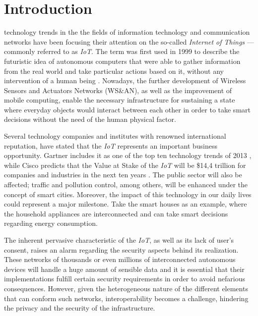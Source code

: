 \documentclass[journal]{IEEEtran}
\begin{document}
\section{Introduction}
   technology trends in the the fields of information technology and communication networks have been focusing their attention on the so-called \emph{Internet of Things} ---commonly referred to as \emph{IoT}. The term was first used in 1999 to describe the futuristic idea of autonomous computers that were able to gather information from the real world and take particular actions based on it, without any intervention of a human being \cite{Ashton2009}. Nowadays, the further development of Wireless Sensors and Actuators Networks (WS\&AN), as well as the improvement of mobile computing, enable the necessary infrastructure for sustaining a state where everyday objects would interact between each other in order to take smart decisions without the need of the human physical factor.

  Several technology companies and institutes with renowned international reputation, have stated that the \emph{IoT} represents an important business opportunity. Gartner includes it as one of the top ten technology trends of 2013 \cite{Gartner2012}, while Cisco predicts that the Value at Stake of the \emph{IoT} will be \$14,4 trillion for companies and industries in the next ten years \cite{JosephBradley2013}. The public sector will also be affected; traffic and pollution control, among others, will be enhanced under the concept of smart cities. Moreover, the impact of this technology in our daily lives could represent a major milestone. Take the smart houses as an example, where the household appliances are interconnected and can take smart decisions regarding energy consumption.

  The inherent pervasive characteristic of the \emph{IoT}, as well as its lack of user's consent, raises an alarm regarding the security aspects behind its realization. These networks of thousands or even millions of interconnected autonomous devices will handle a huge amount of sensible data and it is essential that their implementations fulfill certain security requirements in order to avoid nefarious consequences. However, given the heterogeneous nature of the different elements that can conform such networks, interoperability becomes a challenge, hindering the privacy and the security of the infrastructure.
\end{document}
